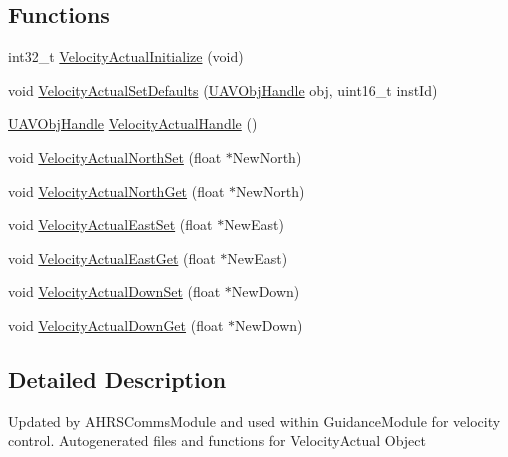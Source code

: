 \subsection*{\-Functions}
\begin{DoxyCompactItemize}
\item 
int32\-\_\-t \hyperlink{group___velocity_actual_ga16c49f1662a6b352dff1cc2895a9fd15}{\-Velocity\-Actual\-Initialize} (void)
\item 
void \hyperlink{group___velocity_actual_ga59de166e6ece49f1f9977644942662ba}{\-Velocity\-Actual\-Set\-Defaults} (\hyperlink{targets_2_u_a_v_objects_2inc_2uavobjectmanager_8h_a279053e22be53ce9f895043aaeb91e3b}{\-U\-A\-V\-Obj\-Handle} obj, uint16\-\_\-t inst\-Id)
\item 
\hyperlink{targets_2_u_a_v_objects_2inc_2uavobjectmanager_8h_a279053e22be53ce9f895043aaeb91e3b}{\-U\-A\-V\-Obj\-Handle} \hyperlink{group___velocity_actual_gabca661b6438fedc60710761290f56d1a}{\-Velocity\-Actual\-Handle} ()
\item 
void \hyperlink{group___velocity_actual_gafaf678907bb5a240628badaa10a4102f}{\-Velocity\-Actual\-North\-Set} (float $\ast$\-New\-North)
\item 
void \hyperlink{group___velocity_actual_ga803d9afadb5290b2190bfbadea1746e8}{\-Velocity\-Actual\-North\-Get} (float $\ast$\-New\-North)
\item 
void \hyperlink{group___velocity_actual_ga872b1d4899ccff87c5d8340564428a1b}{\-Velocity\-Actual\-East\-Set} (float $\ast$\-New\-East)
\item 
void \hyperlink{group___velocity_actual_ga838bfb05d7e180f9057ee20d78388d7c}{\-Velocity\-Actual\-East\-Get} (float $\ast$\-New\-East)
\item 
void \hyperlink{group___velocity_actual_ga163f5b0645d2b6e69e53b0e6b477fb79}{\-Velocity\-Actual\-Down\-Set} (float $\ast$\-New\-Down)
\item 
void \hyperlink{group___velocity_actual_gace0ade7fd662ef277249dd87f299fd3a}{\-Velocity\-Actual\-Down\-Get} (float $\ast$\-New\-Down)
\end{DoxyCompactItemize}


\subsection{\-Detailed \-Description}
\-Updated by \-A\-H\-R\-S\-Comms\-Module and used within \-Guidance\-Module for velocity control. \-Autogenerated files and functions for \-Velocity\-Actual \-Object 

